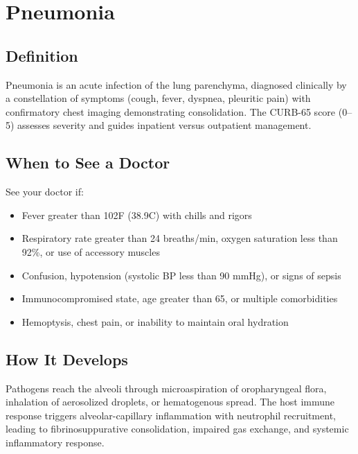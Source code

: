 \chapter{Pneumonia}

\section*{Definition}
Pneumonia is an acute infection of the lung parenchyma, diagnosed clinically by a constellation of symptoms (cough, fever, dyspnea, pleuritic pain) with confirmatory chest imaging demonstrating consolidation. The CURB-65 score (0--5) assesses severity and guides inpatient versus outpatient management.

\section*{When to See a Doctor}
See your doctor if:
\begin{itemize}
  \item Fever greater than 102\textdegree{}F (38.9\textdegree{}C) with chills and rigors
  \item Respiratory rate greater than 24 breaths/min, oxygen saturation less than 92\%, or use of accessory muscles
  \item Confusion, hypotension (systolic BP less than 90 mmHg), or signs of sepsis
  \item Immunocompromised state, age greater than 65, or multiple comorbidities
  \item Hemoptysis, chest pain, or inability to maintain oral hydration
\end{itemize}

\section*{How It Develops}
Pathogens reach the alveoli through microaspiration of oropharyngeal flora, inhalation of aerosolized droplets, or hematogenous spread. The host immune response triggers alveolar-capillary inflammation with neutrophil recruitment, leading to fibrinosuppurative consolidation, impaired gas exchange, and systemic inflammatory response.

